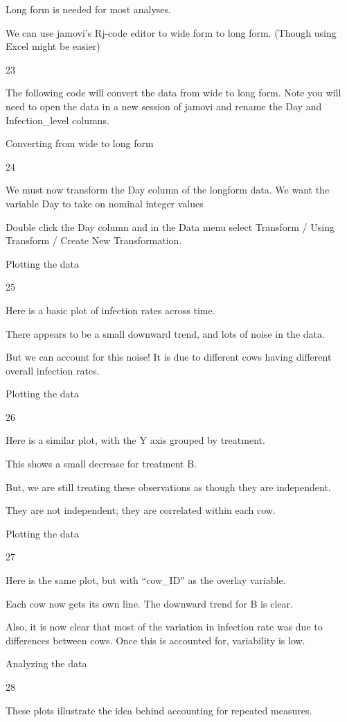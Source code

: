 \documentclass[
  letterpaper,
  DIV=11,
  numbers=noendperiod]{scrreprt}
\begin{document}
Long form is needed for most analyses.

We can use jamovi's Rj-code editor to wide form to long form. (Though
using Excel might be easier)

23

The following code will convert the data from wide to long form. Note
you will need to open the data in a new session of jamovi and rename the
Day and Infection\_level columns.

Converting from wide to long form

24

We must now transform the Day column of the longform data. We want the
variable Day to take on nominal integer values

Double click the Day column and in the Data menu select Transform /
Using Transform / Create New Transformation.

Plotting the data

25

Here is a basic plot of infection rates across time.

There appears to be a small downward trend, and lots of noise in the
data.

But we can account for this noise! It is due to different cows having
different overall infection rates.

Plotting the data

26

Here is a similar plot, with the Y axis grouped by treatment.

This shows a small decrease for treatment B.

But, we are still treating these observations as though they are
independent.

They are not independent; they are correlated within each cow.

Plotting the data

27

Here is the same plot, but with ``cow\_ID'' as the overlay variable.

Each cow now gets its own line. The downward trend for B is clear.

Also, it is now clear that most of the variation in infection rate was
due to differences between cows. Once this is accounted for, variability
is low.

Analyzing the data

28

These plots illustrate the idea behind accounting for repeated measures.
\end{document}
